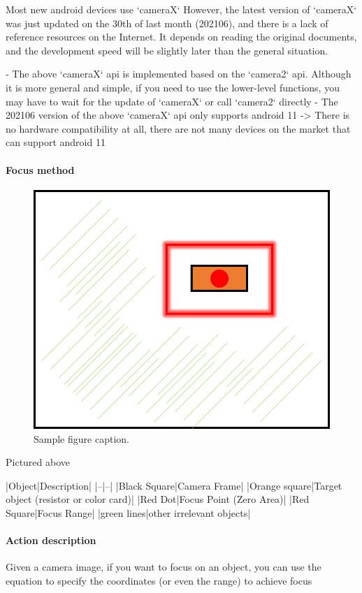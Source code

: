 \documentclass{article}
\begin{document}
Most new android devices use `cameraX`
However, the latest version of `cameraX` was just updated on the 30th of last month (202106), and there is a lack of reference resources on the Internet. It depends on reading the original documents, and the development speed will be slightly later than the general situation.

- The above `cameraX` api is implemented based on the `camera2` api. Although it is more general and simple, if you need to use the lower-level functions, you may have to wait for the update of `cameraX` or call `camera2` directly
- The 202106 version of the above `cameraX` api only supports android 11 -> There is no hardware compatibility at all, there are not many devices on the market that can support android 11

\paragraph{Focus method}

\begin{figure}
	\centering
	\includegraphics[width=0.7\linewidth]{oqKRMoT.png}
	\caption{Sample figure caption.}
	\label{fig:oqKRMoT}
\end{figure}

Pictured above

|Object|Description|
|--|--|
|Black Square|Camera Frame|
|Orange square|Target object (resistor or color card)|
|Red Dot|Focus Point (Zero Area)|
|Red Square|Focus Range|
|green lines|other irrelevant objects|

\paragraph{Action description}

Given a camera image, if you want to focus on an object, you can use the equation to specify the coordinates (or even the range) to achieve focus
\end{document}
